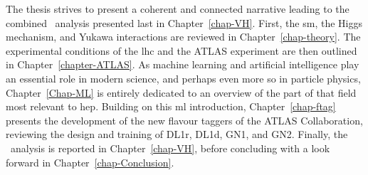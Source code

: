 The thesis strives to present a coherent and connected narrative leading to the combined \vhbc\ analysis presented last in Chapter~\ref{chap-VH}. First, the \gls{sm}, the Higgs mechanism, and Yukawa interactions are reviewed in Chapter~\ref{chap-theory}. The experimental conditions of the \gls{lhc} and the ATLAS experiment are then outlined in Chapter~\ref{chapter-ATLAS}. As machine learning and artificial intelligence play an essential role in modern science, and perhaps even more so in particle physics, Chapter~\ref{Chap-ML} is entirely dedicated to an overview of the part of that field most relevant to \gls{hep}. Building on this \gls{ml} introduction, Chapter~\ref{chap-ftag} presents the development of the new flavour taggers of the ATLAS Collaboration, reviewing the design and training of DL1r, DL1d, GN1, and GN2. Finally, the \vhbc\ analysis is reported in Chapter~\ref{chap-VH}, before concluding with a look forward in Chapter~\ref{chap-Conclusion}.